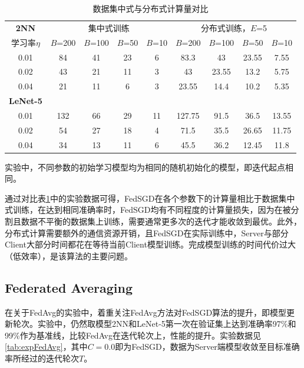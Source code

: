 \documentclass[zihao = -4,cn]{oucart}
\begin{document}
\begin{table}[!htbp] 
\caption{\label{tab:experiment}数据集中式与分布式计算量对比}
\begin{tabular}{ccccccccc} 
\toprule 
\textbf{2NN} & \multicolumn{4}{c}{集中式训练} & \multicolumn{4}{c}{分布式训练，$E$=5}\\ 
学习率$\eta$ & $B$=200 & $B$=100 & $B$=50 & $B$=10 & $B$=200 & $B$=100 & $B$=50 & $B$=10 \\
\midrule 
0.01 & 84 & 41 & 23 & 6 & 83.3 & 43 & 23.55 & 7.55 \\ 
0.02 & 43 & 21 & 11 & 3 & 43 & 23.55 & 13.2 & 5.75 \\ 
0.04 & 21 & 11 & 6  & 3 & 23.55 & 14.4 & 10.2 & 5.35 \\ 
\bottomrule
\textbf{LeNet-5} \\
\hline
0.01 & 132 & 66 & 29 & 11 & 127.75 & 91.5 & 36.5 & 13.55 \\ 
0.02 & 54 & 27 & 18 & 4 & 71.5 & 35.5 & 26.65 & 11.75 \\ 
0.04 & 34 & 13 & 11 & 6 & 45.5 & 36.2 & 12.45 & 11.8 \\ 
\hline
\end{tabular}
\footnotesize
\qquad 实验中，不同参数的初始学习模型均为相同的随机初始化的模型，即迭代起点相同。
\end{table}
通过对比表\ref{tab:experiment}中的实验数据可得，FedSGD在各个参数下的计算量相比于数据集中式训练，在达到相同准确率时，FedSGD均有不同程度的计算量损失，因为在被分割且数据不平衡的数据集上训练，需要通常更多次的迭代才能收敛到最优。此外，分布式计算需要额外的通信资源开销，且FedSGD在实际训练中，Server与部分Client大部分时间都花在等待当前Client模型训练。完成模型训练的时间代价过大（低效率），是该算法的主要问题。

\subsection{Federated Averaging}
在关于FedAvg的实验中，着重关注FedAvg方法对FedSGD算法的提升，即模型更新轮次。实验中，仍然取模型2NN和LeNet-5第一次在验证集上达到准确率97\%和99\%作为基准线，比较FedAvg在迭代轮次上，性能的提升。实验数据见\ref{tab:expFedAvg}，其中$C=0.0$即为FedSGD，数据为Server端模型收敛至目标准确率所经过的迭代轮次$T$。\par
\end{document}
